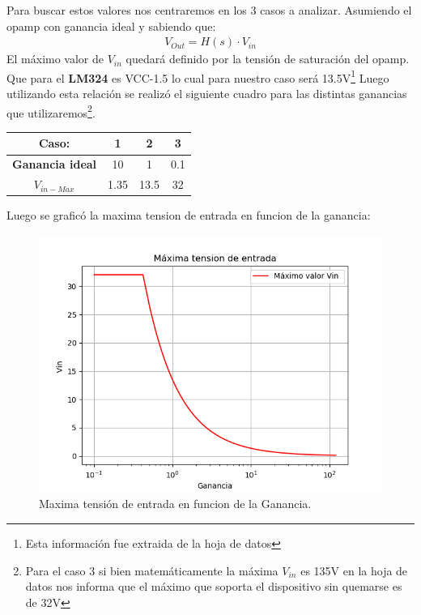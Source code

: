 Para buscar estos valores nos centraremos en los 3 casos a analizar. 
Asumiendo el opamp con ganancia ideal y sabiendo que:
\begin{align} V_{Out}=H(s)\cdot V_{in}\end{align}
El máximo valor de $V_{in}$ quedará definido por la tensión de saturación del opamp. Que para el \textbf{LM324} es VCC-1.5 lo cual para nuestro caso será 13.5V\footnote{Esta información fue extraida de la hoja de datos}
Luego utilizando esta relación se realizó el siguiente cuadro para las distintas ganancias que utilizaremos\footnote{Para el caso 3 si bien matemáticamente la máxima $V_{in}$ es 135V en la hoja de datos nos informa que el máximo que soporta el dispositivo sin quemarse es de 32V }.
\begin{table}[H]
\begin{center}
\label{tab:maxin}
\begin{tabular}{|c|c|c|c|}
\hline
\textbf{Caso:}        & \textbf{1} & \textbf{2} & \textbf{3} \\ \hline
\textbf{Ganancia ideal}     & 10         & 1          & 0.1        \\ \hline
\textbf{$V_{in-Max}$} & 1.35       & 13.5       & 32         \\ \hline
\end{tabular}
\end{center}
\end{table}
Luego se graficó la maxima tension de entrada en funcion de la ganancia:
\begin{figure}[H]	
	\centering
	\includegraphics[width=\textwidth]{Ejercicio1/Imagenes/maxvin.png}
	\caption{Maxima tensión de entrada en funcion de la Ganancia.}
	\label{fig:MaxVin}
\end{figure} 
